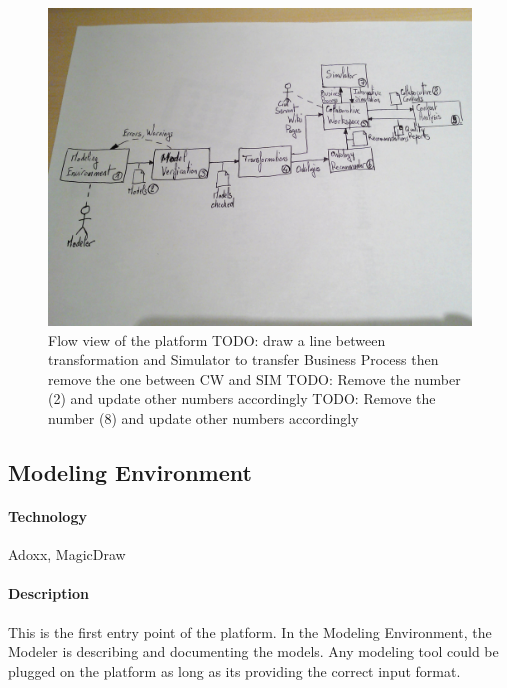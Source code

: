 \documentclass{learnpad}
\begin{document}
\begin{figure}[!htp]
	\centering
	\includegraphics[width=.6\paperwidth,keepaspectratio]{figures/learnpad-flow.jpg}
	\caption{Flow view of the \learnpad platform\newline
	TODO: draw a line between transformation and Simulator to transfer Business Process then remove the one between CW and SIM\newline
	TODO: Remove the number (2) and update other numbers accordingly\newline
	TODO: Remove the number (8) and update other numbers accordingly}
	\label{fig:flow-view}
\end{figure}

\subsection{Modeling Environment}
\label{sec:modeling-environment}

\paragraph{Technology}
Adoxx, MagicDraw

\paragraph{Description}
This is the first entry point of the platform.  In the Modeling Environment, the
Modeler is describing and documenting the models.  Any modeling tool could be
plugged on the \learnpad platform as long as its providing the correct input
format.
\end{document}
